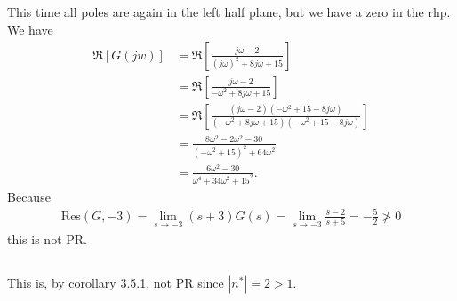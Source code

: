 \documentclass[]{article}
\begin{document}
\subsection{}
This time all poles are again in the left half plane, but we have a zero in the rhp. We have
\begin{equation}\begin{aligned}
\Re \left[ G(jw) \right]
&= \Re \left[ \frac{j\omega - 2}{(j\omega)^2 + 8j \omega + 15} \right] \\
&= \Re \left[\frac{j \omega - 2}{-\omega^2 + 8j \omega + 15} \right] \\
&= \Re \left[\frac{(j \omega - 2)(-\omega^2+ 15 - 8j  \omega )}{(-\omega^2 + 8j \omega + 15)(-\omega^2+ 15 - 8j  \omega )} \right] \\
&= \frac{8 \omega^2 - 2\omega^2 - 30}{(-\omega^2 + 15)^2 + 64 \omega^2} \\
&= \frac{6 \omega^2 - 30}{\omega^4 + 34 \omega^2 + 15^2}.
\end{aligned}\end{equation}
Because
\begin{equation}\begin{aligned}
\text{Res}(G,-3) = \lim_{s \rightarrow -3} (s+3)G(s) = \lim_{s \rightarrow -3}\frac{s-2}{s+5} = -\frac{5}{2} \not > 0
\end{aligned}\end{equation}
this is not PR.
\subsection{}
This is, by corollary 3.5.1, not PR since $|n^*| = 2 > 1$.
\end{document}
